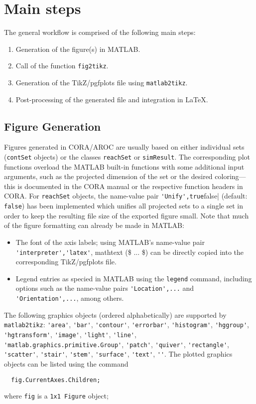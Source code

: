\documentclass{article}
\begin{document}
\section{Main steps}
\label{sec:mainsteps}

The general workflow is comprised of the following main steps:
%
\begin{enumerate}[itemsep=0pt]
	\item Generation of the figure(s) in MATLAB.
	\item Call of the function \verb|fig2tikz|.
	\item Generation of the TikZ/pgfplots file using \verb|matlab2tikz|.
	\item Post-processing of the generated file and integration in LaTeX.
\end{enumerate}

\subsection{Figure Generation}
\label{ssec:figuregeneration}

Figures generated in CORA/AROC are usually based on either individual sets (\verb|contSet| objects) or the classes \verb|reachSet| or \verb|simResult|.
The corresponding plot functions overload the MATLAB built-in functions with some additional input arguments, such as the projected dimension of the set or the desired coloring---this is documented in the CORA manual or the respective function headers in CORA.
For \verb|reachSet| objects, the name-value pair \verb|'Unify',true|false| (default: \verb|false|) has been implemented which unifies all projected sets to a single set in order to keep the resulting file size of the exported figure small.
Note that much of the figure formatting can already be made in MATLAB:
%
\begin{itemize}[itemsep=0pt]
	\item The font of the axis labels; using MATLAB's name-value pair \verb|'interpreter','latex'|, mathtext (\$ ... \$) can be directly copied into the corresponding TikZ/pgfplots file.
	\item Legend entries as specied in MATLAB using the \verb|legend| command, including options such as the name-value pairs \verb|'Location',...| and \verb|'Orientation',...|, among others.
\end{itemize}
%
The following graphics objects (ordered alphabetically) are supported by \verb|matlab2tikz|:
\verb|'area'|, \verb|'bar'|, \verb|'contour'|, \verb|'errorbar'|, \verb|'histogram'|, \verb|'hggroup'|, \verb|'hgtransform'|, \verb|'image'|, \verb|'light'|, \verb|'line'|, \linebreak \verb|'matlab.graphics.primitive.Group'|, \verb|'patch'|, \verb|'quiver'|, \verb|'rectangle'|, \verb|'scatter'|, \verb|'stair'|, \verb|'stem'|, \verb|'surface'|, \verb|'text'|, \verb|''|.
The plotted graphics objects can be listed using the command
%
\begin{verbatim}
  fig.CurrentAxes.Children;
\end{verbatim}
%
where \verb|fig| is a \verb|1x1 Figure| object;
\end{document}
